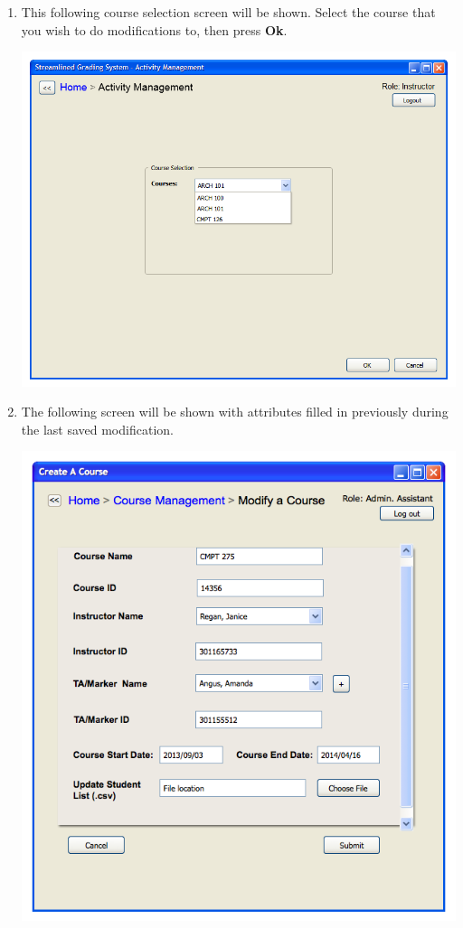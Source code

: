 \documentclass{article}
\begin{document}
\begin{enumerate}
\begin{center}
   \end{center}
 \item This following course selection screen will be shown. Select the course
   that you wish to do modifications to, then press \textbf{Ok}.
   \begin{center} 
     \includegraphics[scale=0.55]{../images/UIMockups/pngs/CourseSelectionAM}
   \end{center}
 \item The following screen will be shown with attributes filled in
   previously during the last saved modification. 
   \begin{center}
     \includegraphics[scale=0.55]{../images/UIMockups/pngs/modifyACourse}

\end{center}
\end{enumerate}
\end{document}

